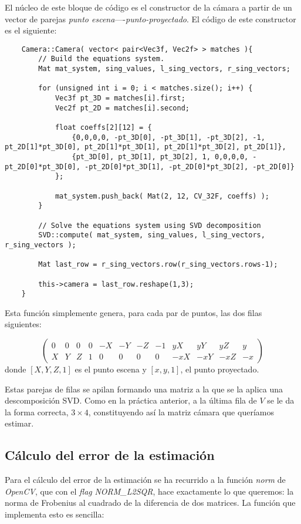 \documentclass[a4paper, 11pt]{article}
\theoremstyle{definition}
\theoremstyle{theorem}
\begin{document}
    El núcleo de este bloque de código es el constructor de la cámara a partir de un vector de parejas \emph{punto escena}----\emph{punto-proyectado}. El código de este constructor es el siguiente:

    \begin{lstlisting}
    Camera::Camera( vector< pair<Vec3f, Vec2f> > matches ){
        // Build the equations system.
        Mat mat_system, sing_values, l_sing_vectors, r_sing_vectors;

        for (unsigned int i = 0; i < matches.size(); i++) {
            Vec3f pt_3D = matches[i].first;
            Vec2f pt_2D = matches[i].second;

            float coeffs[2][12] = {
                {0,0,0,0, -pt_3D[0], -pt_3D[1], -pt_3D[2], -1, pt_2D[1]*pt_3D[0], pt_2D[1]*pt_3D[1], pt_2D[1]*pt_3D[2], pt_2D[1]},
                {pt_3D[0], pt_3D[1], pt_3D[2], 1, 0,0,0,0, -pt_2D[0]*pt_3D[0], -pt_2D[0]*pt_3D[1], -pt_2D[0]*pt_3D[2], -pt_2D[0]}
            };

            mat_system.push_back( Mat(2, 12, CV_32F, coeffs) );
        }

        // Solve the equations system using SVD decomposition
        SVD::compute( mat_system, sing_values, l_sing_vectors, r_sing_vectors );

        Mat last_row = r_sing_vectors.row(r_sing_vectors.rows-1);

        this->camera = last_row.reshape(1,3);
    }
    \end{lstlisting}

    Esta función simplemente genera, para cada par de puntos, las dos filas siguientes:

    \[
    \left(
    \begin{array}{cccccccccccc}
        0 & 0 & 0 & 0 & -X & -Y & -Z & -1 & yX & yY & yZ & y \\
        X & Y & Z & 1 & 0 & 0 & 0 & 0 & -xX & -xY & -xZ & -x
    \end{array}
    \right)
    \]
    donde $[X,Y,Z,1]$ es el punto escena y $[x,y,1]$, el punto proyectado.

    Estas parejas de filas se apilan formando una matriz a la que se la aplica una descomposición SVD. Como en la práctica anterior, a la última fila de $V$ se le da la forma correcta, $3\times4$, constituyendo así la matriz cámara que queríamos estimar.

    \subsection{Cálculo del error de la estimación}
    Para el cálculo del error de la estimación se ha recurrido a la función \emph{norm} de \emph{OpenCV}, que con el \emph{flag} \emph{NORM\_L2SQR}, hace exactamente lo que queremos: la norma de Frobenius al cuadrado de la diferencia de dos matrices. La función que implementa esto es sencilla:
\end{document}
